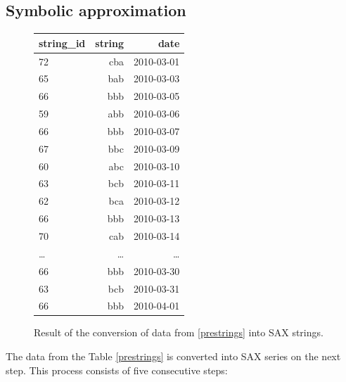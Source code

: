 \documentclass[a4paper,10pt]{article}
\numberwithin{equation}{subsection}
\begin{document}
\subsection{Symbolic approximation}
\begin{figure}
  \begin{center}
     \caption{Result of the conversion of data from \ref{prestrings} into SAX strings.}
     \begin{tabularx}{0.4\textwidth}{ | X | r | r |}
      \hline           
       string\_id & string & date\\ 
      \hline    
      72 & cba & 2010-03-01\\ 
      65 & bab & 2010-03-03\\ 
      66 & bbb & 2010-03-05\\ 
      59 & abb & 2010-03-06\\ 
      66 & bbb & 2010-03-07\\ 
      67 & bbc & 2010-03-09\\ 
      60 & abc & 2010-03-10\\ 
      63 & bcb & 2010-03-11\\ 
      62 & bca & 2010-03-12\\ 
      66 & bbb & 2010-03-13\\ 
      70 & cab & 2010-03-14\\ 
      \ldots & \ldots & \ldots \\ 
      66 & bbb & 2010-03-30\\ 
      63 & bcb & 2010-03-31\\ 
      66 & bbb & 2010-04-01\\
      \hline    
     \end{tabularx}
     \label{tab:strings}
  \end{center}
\end{figure}

The data from the Table \ref{prestrings} is converted into SAX series on the next step. This process consists of 
five consecutive steps:
\end{document}
